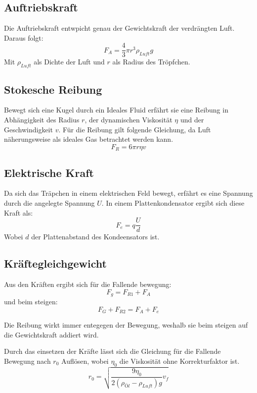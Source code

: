 \subsection{Auftriebskraft}
Die Auftriebskraft entwpicht genau der Gewichtskraft der verdrängten Luft. Daraus folgt:
\begin{equation}
    F_A = \frac{4}{3}\pi r^3 \rho_{Luft} g
\end{equation}
Mit $\rho_{Luft}$ als Dichte der Luft und $r$ als Radius des Tröpfchen.

\subsection{Stokesche Reibung}
Bewegt sich eine Kugel durch ein Ideales Fluid erfährt sie eine Reibung in Abhängigkeit des Radius $r$, der dynamischen Viskosität $\eta$ und der Geschwindigkeit $v$.
Für die Reibung gilt folgende Gleichung, da Luft näherungsweise als ideales Gas betrachtet werden kann.
\begin{equation}
    F_R = 6 \pi r \eta v
\end{equation}

\subsection{Elektrische Kraft}
Da sich das Träpchen in einem elektrischen Feld bewegt, erfährt es eine Spannung durch die angelegte Spannung $U$.
In einem Plattenkondensator ergibt sich diese Kraft als:
\begin{equation}
    F_e = q\frac{U}{d}
\end{equation}
Wobei $d$ der Plattenabstand des Kondeensators ist.

\subsection{Kräftegleichgewicht}
Aus den Kräften ergibt sich für die Fallende bewegung:
\begin{equation}
    F_g = F_{R1} + F_A
\end{equation}
und beim steigen:
\begin{equation}
    F_G + F_{R2} = F_A + F_e
\end{equation}

Die Reibung wirkt immer entegegen der Bewegung, weshalb sie beim steigen auf die Gewichtskraft addiert wird.

Durch das einsetzen der Kräfte lässt sich die Gleichung für die Fallende Bewegung nach $r_0$ Auflösen, wobei $\eta_0$ die Viskosität ohne Korrekturfaktor ist.
\begin{equation}
    r_0 = \sqrt{\frac{9 \eta_0}{2 (\rho_{Öl}- \rho_{Luft}) g} v_f} \label{eq:r0}
\end{equation}

